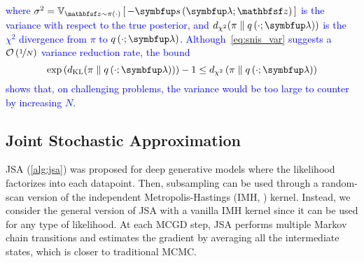 %
\textcolor{blue}{
where \(\sigma^2 = \Vsub{\rvvz \sim \pi\left(\cdot\right)}{ -\vs\left(\vlambda; \rvvz \right) }\) is the variance with respect to the true posterior, and \(\DChi{\pi}{q\left(\cdot; \vlambda\right)}\) is the \(\chi^2\) divergence from \(\pi\) to \(q\left(\cdot; \vlambda\right)\).
Although~\cref{eq:snis_var} suggests a \(\mathcal{O}\left(\nicefrac{1}{N}\right)\) variance reduction rate, the bound
%
\[
\exp\left( \DKL{\pi}{q\left(\cdot; \vlambda\right)} \right) - 1 \leq  d_{\chi^2}\left(\pi \parallel q\left(\cdot; \vlambda\right) \right)
\]
shows that, on challenging problems, the variance would be too large to counter by increasing \(N\).
}

\vspace{-0.1in}
\subsection{Joint Stochastic Approximation}
\vspace{-0.1in}
JSA (\cref{alg:jsa}) was proposed for deep generative models where the likelihood factorizes into each datapoint.
Then, subsampling can be used through a random-scan version of the independent Metropolis-Hastings (IMH, \citealt{hastings_monte_1970}) kernel.
Instead, we consider the general version of JSA with a vanilla IMH kernel since it can be used for any type of likelihood.
\pagebreak
At each MCGD step, JSA performs multiple Markov chain transitions and estimates the gradient by averaging all the intermediate states, which is closer to traditional MCMC.

\vspace{-0.1in}
